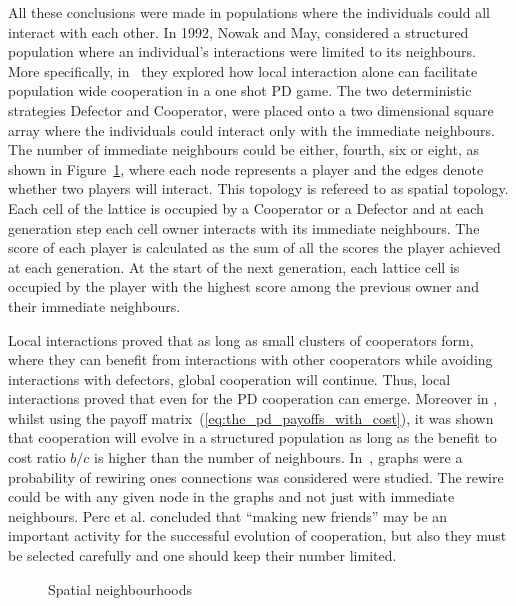 All these conclusions were made in populations where the individuals could all
interact with each other. In 1992, Nowak and May, considered a structured population
where an individual's interactions were limited to its neighbours.
More specifically, in~\cite{Nowak1992b} they explored how local interaction
alone can facilitate population wide cooperation in a one shot PD game. The two
deterministic strategies Defector and Cooperator, were placed onto a two
dimensional square array where the individuals could interact only with the
immediate neighbours. The number of immediate neighbours could be either,
fourth, six or eight, as shown in Figure~\ref{fig:topologies}, where each node
represents a player and the edges denote whether two players will interact. This
topology is refereed to as spatial topology. Each cell of the lattice is
occupied by a Cooperator or a Defector and at each generation step each cell owner
interacts with its immediate neighbours. The score of each player is calculated
as the sum of all the scores the player achieved at each generation. At the
start of the next generation, each lattice cell is occupied by the player with
the highest score among the previous owner and their immediate neighbours.

Local interactions proved that as long as small clusters of cooperators form, where
they can benefit from interactions with other cooperators while avoiding
interactions with defectors, global cooperation will continue. Thus, local
interactions proved that even for the PD cooperation can emerge. Moreover in
\cite{Ohtsuki2006}, whilst using the payoff
matrix~(\ref{eq:the_pd_payoffs_with_cost}), it was shown that cooperation will
evolve in a structured population as long as the benefit to cost ratio \(b / c\)
is higher than the number of neighbours. In~\cite{Perc2011}, graphs were a probability
of rewiring ones connections was considered were studied. The rewire could be with any
given node in the graphs and not just with immediate neighbours. Perc et al.
concluded that ``making new friends'' may be an important activity for the
successful evolution of cooperation, but also they must be selected
carefully and one should keep their number limited.

\begin{figure}[!hbtp]
\centering
    \begin{subfigure}{.25\textwidth}
        
    \end{subfigure}
    \begin{subfigure}{.25\textwidth}\centering
        
     \end{subfigure}
     \begin{subfigure}{.25\textwidth}\centering
        
     \end{subfigure}
     \caption{Spatial neighbourhoods}\label{fig:topologies}
    \end{figure}

